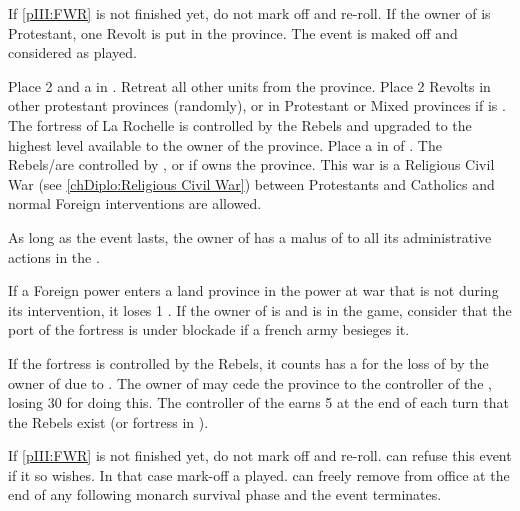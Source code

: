 

\condition{}
\aparag If \ref{pIII:FWR} is not finished yet, do not mark off and re-roll.
\aparag If the owner of \provincePoitou is Protestant, one Revolt \faceplus is
put in the province.  The event is maked off and considered as played.

\phevnt
\aparag Place 2 \REVOLT \faceplus and a \LD in \provincePoitou.  Retreat all
other units from the province.
\aparag Place 2 Revolts \facemoins in other protestant provinces (randomly),
or in Protestant or Mixed provinces if \FRA is \CATHCR.
\aparag The fortress of La Rochelle is controlled by the Rebels and upgraded
to the highest level available to the owner of the province.
\aparag Place a \PIRATE\faceplus in \CTZ of \FRA.
\aparag The Rebels/\REVOLT are controlled by \ENG, or \FRA if \ENG owns the
province. This war is a Religious Civil War (see \ref{chDiplo:Religious Civil
  War}) between Protestants and Catholics and normal Foreign interventions are
allowed.

\phadm
\aparag As long as the event lasts, the owner of \provincePoitou has a malus
of  to all its administrative actions in the \ROTW.

\phmil
\aparag If a Foreign power enters a land province in the power at war that is
not \provincePoitou during its intervention, it loses 1 \STAB.
\aparag If the owner of \provincePoitou is \FRA and  is in
the game, consider that the port of the fortress is under blockade if a french
army besieges it.

\phpaix
\aparag If the fortress is controlled by the Rebels, it counts has a \REVOLT
\facemoins for the loss of \STAB by the owner of \provincePoitou due to
\REVOLT .
\aparag The owner of \provincePoitou may cede the province to the controller
of the \REVOLT , losing 30 \PV for doing this.
\aparag The controller of the \REVOLT earns 5 \PV at the end of each turn that
the Rebels exist (\REVOLT or fortress in \provincePoitou).





\condition{}
\aparag If \ref{pIII:FWR} is not finished yet, do not mark off and re-roll.
\aparag \FRA can refuse this event if it so wishes. In that case mark-off a
played.
\aparag \FRA can freely remove  from office at the end of
any following monarch survival phase and the event terminates.

